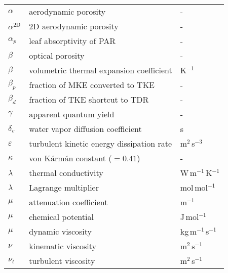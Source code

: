 \begin{longtable}{p{}p{}p{}}

	$\alpha$ & aerodynamic porosity & -\\ 
	$\alpha^{\mathrm{2D}}$ & $2$D aerodynamic porosity & -\\ 	

	$\alpha_p$ &  leaf absorptivity of PAR & -\\ 	

	$\beta$ & optical porosity & -\\ 	
	$\beta$ & volumetric thermal expansion coefficient & K$^{-1}$\\ 	
	$\beta_p$ & fraction of MKE converted to TKE & -\\ 		
	$\beta_d$ & fraction of TKE shortcut to TDR & -\\ 			

	$\gamma$ & apparent quantum yield & - \\ 
	
	$\delta_v$ & water vapor diffusion coefficient & s \\

	$\varepsilon$ & turbulent kinetic energy dissipation rate & m$^2$\,s$^{-3}$ \\ 


	$\kappa$ & von K\'arm\'an constant ($=0.41$) & - \\

	$\lambda$ & thermal conductivity & W\,m$^{-1}$\,K$^{-1}$ \\
	$\lambda$ & Lagrange multiplier & mol\,mol$^{-1}$ \\	
	$\mu$ & attenuation coefficient & m$^{-1}$ \\ 
	$\mu$ & chemical potential & J\,mol$^{-1}$\\
	$\mu$ & dynamic viscosity & kg\,m$^{-1}$\,s$^{-1}$ \\ 


	$\nu$ & kinematic viscosity & m$^2$\,s$^{-1}$ \\ 
	$\nu_t$ & turbulent viscosity & m$^2$\,s$^{-1}$ \\ 


\end{longtable}
